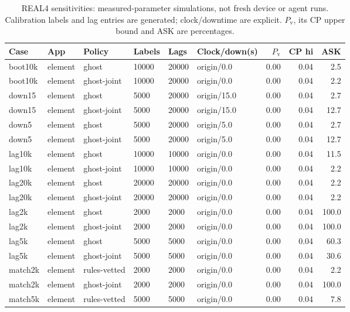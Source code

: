 \begin{table}[!htbp]
\centering
\caption{REAL4 sensitivities: measured-parameter simulations, not fresh device or agent runs.
Calibration labels and lag entries are generated; clock/downtime are explicit.
$P_{\mathrm v}$, its CP upper bound and ASK are percentages.}
\label{tab:real4}
\scriptsize
\begin{tabular}{@{}llllllrrr@{}}
\toprule
Case & App & Policy & Labels & Lags & Clock/down(s) & $P_{\mathrm v}$ & CP hi & ASK \\
\midrule
boot10k & element & ghost & 10000 & 20000 & origin/0.0 & 0.00 & 0.04 & 2.5 \\
boot10k & element & ghost-joint & 10000 & 20000 & origin/0.0 & 0.00 & 0.04 & 2.2 \\
down15 & element & ghost & 5000 & 20000 & origin/15.0 & 0.00 & 0.04 & 2.7 \\
down15 & element & ghost-joint & 5000 & 20000 & origin/15.0 & 0.00 & 0.04 & 12.7 \\
down5 & element & ghost & 5000 & 20000 & origin/5.0 & 0.00 & 0.04 & 2.7 \\
down5 & element & ghost-joint & 5000 & 20000 & origin/5.0 & 0.00 & 0.04 & 12.7 \\
lag10k & element & ghost & 10000 & 10000 & origin/0.0 & 0.00 & 0.04 & 11.5 \\
lag10k & element & ghost-joint & 10000 & 10000 & origin/0.0 & 0.00 & 0.04 & 2.2 \\
lag20k & element & ghost & 20000 & 20000 & origin/0.0 & 0.00 & 0.04 & 2.2 \\
lag20k & element & ghost-joint & 20000 & 20000 & origin/0.0 & 0.00 & 0.04 & 2.2 \\
lag2k & element & ghost & 2000 & 2000 & origin/0.0 & 0.00 & 0.04 & 100.0 \\
lag2k & element & ghost-joint & 2000 & 2000 & origin/0.0 & 0.00 & 0.04 & 100.0 \\
lag5k & element & ghost & 5000 & 5000 & origin/0.0 & 0.00 & 0.04 & 60.3 \\
lag5k & element & ghost-joint & 5000 & 5000 & origin/0.0 & 0.00 & 0.04 & 30.6 \\
match2k & element & rules-vetted & 2000 & 2000 & origin/0.0 & 0.00 & 0.04 & 2.2 \\
match2k & element & ghost-joint & 2000 & 2000 & origin/0.0 & 0.00 & 0.04 & 100.0 \\
match5k & element & rules-vetted & 5000 & 5000 & origin/0.0 & 0.00 & 0.04 & 7.8 \\

\end{tabular}
\end{table}
